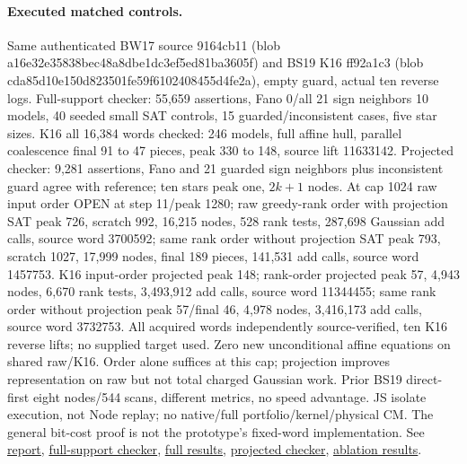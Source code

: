 \documentclass[11pt]{article}
\begin{document}
\paragraph{Executed matched controls.}
Same authenticated BW17 source 9164cb11 (blob a16e32e35838bec48a8dbe1dc3ef5ed81ba3605f) and BS19 K16 ff92a1c3 (blob cda85d10e150d823501fe59f6102408455d4fe2a), empty guard, actual ten reverse logs. Full-support checker: 55,659 assertions, Fano 0/all 21 sign neighbors 10 models, 40 seeded small SAT controls, 15 guarded/inconsistent cases, five star sizes. K16 all 16,384 words checked: 246 models, full affine hull, parallel coalescence final 91 to 47 pieces, peak 330 to 148, source lift 11633142. Projected checker: 9,281 assertions, Fano and 21 guarded sign neighbors plus inconsistent guard agree with reference; ten stars peak one, $2k+1$ nodes. At cap 1024 raw input order OPEN at step 11/peak 1280; raw greedy-rank order with projection SAT peak 726, scratch 992, 16,215 nodes, 528 rank tests, 287,698 Gaussian add calls, source word 3700592; same rank order without projection SAT peak 793, scratch 1027, 17,999 nodes, final 189 pieces, 141,531 add calls, source word 1457753. K16 input-order projected peak 148; rank-order projected peak 57, 4,943 nodes, 6,670 rank tests, 3,493,912 add calls, source word 11344455; same rank order without projection peak 57/final 46, 4,978 nodes, 3,416,173 add calls, source word 3732753. All acquired words independently source-verified, ten K16 reverse lifts; no supplied target used. Zero new unconditional affine equations on shared raw/K16. Order alone suffices at this cap; projection improves representation on raw but not total charged Gaussian work. Prior BS19 direct-first eight nodes/544 scans, different metrics, no speed advantage. JS isolate execution, not Node replay; no native/full portfolio/kernel/physical CM. The general bit-cost proof is not the prototype's fixed-word implementation. See \href{https://github.com/j15marti/pnp/commit/2f069c33051e307d53cf42ef102caf20fedd3c57}{report}, \href{https://github.com/j15marti/pnp/commit/83b50501f6981c804c24add6bb8b9ab77ba269e3}{full-support checker}, \href{https://github.com/j15marti/pnp/commit/765653e57197ea24f36ba1cc4c821c27be273d57}{full results}, \href{https://github.com/j15marti/pnp/commit/411726abb57c4231f4c56b129bde638125e17ee6}{projected checker}, \href{https://github.com/j15marti/pnp/commit/8c9a8c17e8b4e94ad9393572d0ce68d077c10d65}{ablation results}.
\end{document}
